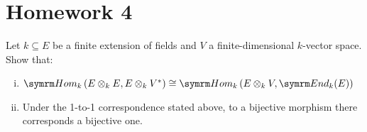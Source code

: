\section*{Homework 4}

\setcounter{exercise}{0}

\begin{exercise}
Let \(k \subseteq E\) be a finite extension of fields and \(V\) a finite-dimensional \(k\)-vector space. Show that:
\begin{enumerate}[(i)]
    \item \(\Hom_k \left(E \tensor_k E, E \tensor_k V^*\right) \cong \Hom_k \left(E \tensor_k V, \End_k(E)\right)\)

    \item Under the 1-to-1 correspondence stated above, to a bijective morphism there corresponds a bijective one.
\end{enumerate}
\end{exercise}
